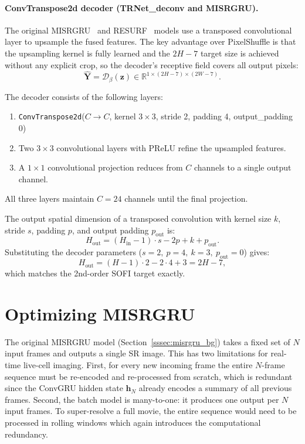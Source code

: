 \paragraph{ConvTranspose2d decoder (TRNet\_deconv and MISRGRU).}
The original MISRGRU~\cite{MISRGRU-original} and RESURF~\cite{resurf2024} models use a
transposed convolutional layer to upsample the fused features. The key advantage over PixelShuffle is that the
upsampling kernel is fully learned and the $2H - 7$ target size is achieved without any explicit crop,
so the decoder's receptive field covers all output pixels:
\begin{equation}
  \hat{\mathbf{Y}} = \mathcal{D}_\beta(\mathbf{z}) \in \mathbb{R}^{1 \times (2H-7) \times (2W-7)}.
  \label{eq:decoder}
\end{equation}

The decoder consists of the following layers:
\begin{enumerate}
  \item \texttt{ConvTranspose2d}($C \to C$, kernel $3\times3$, stride 2, padding 4, output\_padding 0)
  \item Two $3 \times 3$ convolutional layers with PReLU refine the upsampled features.
  \item A $1 \times 1$ convolutional projection reduces from $C$ channels to a single output channel.
\end{enumerate}
All three layers maintain $C = 24$ channels until the final projection.

The output spatial dimension of a transposed convolution with kernel size $k$, stride $s$, padding $p$, and output padding $p_\text{out}$ is:
\begin{equation}
  H_\text{out} = (H_\text{in} - 1) \cdot s - 2p + k + p_\text{out}.
  \label{eq:convtranspose_size}
\end{equation}
Substituting the decoder parameters ($s{=}2,\ p{=}4,\ k{=}3,\ p_\text{out}{=}0$) gives:
\begin{equation}
  H_\text{out} = (H - 1)\cdot 2 - 2\cdot 4 + 3 = 2H - 7,
  \label{eq:decoder_size}
\end{equation}
which matches the 2nd-order SOFI target exactly.


\section{Optimizing MISRGRU}
\label{sec:optimizing_misrgru}

The original MISRGRU model (Section~\ref{sssec:misrgru_bg}) takes a fixed set of $N$ input frames and outputs
a single SR image.
This has two limitations for real-time live-cell imaging.
First, for every new incoming frame the entire $N$-frame sequence must be re-encoded and re-processed
from scratch, which is redundant since the ConvGRU hidden state $\mathbf{h}_N$ already encodes a
summary of all previous frames.
Second, the batch model is many-to-one: it produces one output per $N$ input frames.
To super-resolve a full movie, the entire sequence would need to be processed in rolling windows which
again introduces the computational redundancy.

